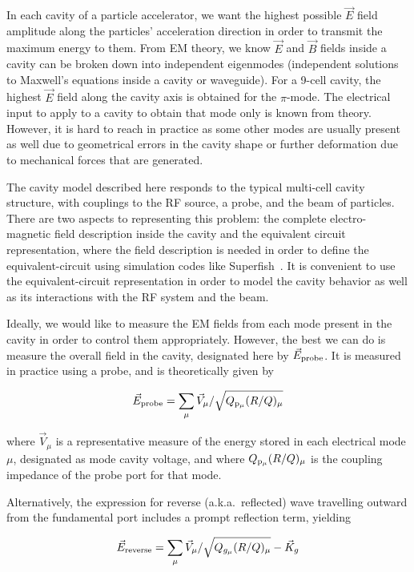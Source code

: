 \documentclass[a4paper,12pt]{article}
\begin{document}
In each cavity of a particle accelerator, we want the highest possible $\vec{E}$ field amplitude along the particles' acceleration direction in order to transmit the maximum energy to them.  From EM theory, we know $\vec{E}$ and $\vec{B}$ fields inside a cavity can be broken down into independent eigenmodes (independent solutions to Maxwell's equations inside a cavity or waveguide). For a 9-cell cavity, the highest $\vec{E}$ field along the cavity axis is obtained for the $\pi$-mode. The electrical input to apply to a cavity to obtain that mode only is known from theory. However, it is hard to reach in practice as some other modes are usually present as well due to geometrical errors in the cavity shape or further deformation due to mechanical forces that are generated.

The cavity model described here responds to the typical multi-cell cavity structure, with couplings to the RF source, a probe, and the beam of particles. There are two aspects to representing this problem: the complete electro-magnetic field description inside the cavity and the equivalent circuit representation, where the field description is needed in order to define the equivalent-circuit using simulation codes like Superfish~\cite{ref:superfish}. It is convenient to use the equivalent-circuit representation in order to model the cavity behavior as well as its interactions with the RF system and the beam.

Ideally, we would like to measure the EM fields from each mode present in the cavity in order to control them appropriately. However, the best  we can do is measure the overall field in the cavity, designated here by $\vec E_{\rm probe}$. It is measured in practice using a probe, and is theoretically given by

\begin{equation}
  \vec E_{\rm probe} = \sum_{\mu} \vec{V}_{\mu} /\sqrt{Q_{\rm p_{\mu}}(R/Q)_{\mu}}
  \label{eq:E_probe}
\end{equation}

\noindent where $\vec{V}_{\mu}$ is a representative measure of the energy stored in each electrical mode $\mu$, designated as mode cavity voltage, and where $Q_{\rm p_{\mu}}(R/Q)_{\mu}$ is the coupling impedance of the probe port for that mode.

Alternatively, the expression for reverse (a.k.a.~reflected) wave travelling outward from the fundamental port includes a prompt reflection term, yielding

\begin{equation}
  \vec E_{\rm reverse}=\sum_\mu \vec V_\mu / \sqrt{Q_{g_{\mu}}(R/Q)_\mu} - \vec K_g
  \label{eq:E_reverse}
\end{equation}
\end{document}
